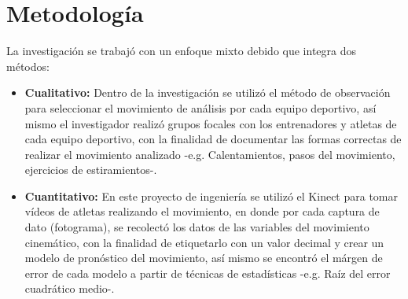 \chapter{Metodolog\'ia}
La investigaci\'on se trabaj\'o con un enfoque mixto debido que integra dos m\'etodos:
\begin{itemize}
	\item \textbf{Cualitativo:} Dentro de la investigaci\'on se utiliz\'o el m\'etodo de observaci\'on para seleccionar el movimiento de an\'alisis por cada equipo deportivo, as\'i mismo el investigador realiz\'o grupos focales con los entrenadores y atletas de cada equipo deportivo, con la finalidad de documentar las formas correctas de realizar el movimiento analizado -e.g. Calentamientos, pasos del movimiento, ejercicios de estiramientos-.
	\item \textbf{Cuantitativo:} En este proyecto de ingenier\'ia se utiliz\'o el Kinect para tomar v\'ideos de atletas realizando el movimiento, en donde por cada captura de dato (fotograma), se recolect\'o los datos de las variables del movimiento cinem\'atico, con la finalidad de etiquetarlo con un valor decimal y crear un modelo de pron\'ostico del movimiento, as\'i mismo se  encontr\'o el m\'argen de error de cada modelo a partir de t\'ecnicas de estad\'isticas -e.g.  Ra\'iz del error cuadr\'atico medio-.
\end{itemize}



